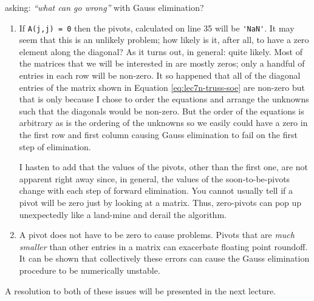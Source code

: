 \vspace{2.0cm}

 asking: \emph{``what can go wrong''} with Gauss elimination?  
\begin{enumerate}
\item If \lstinline[style=myMatlab]{A(j,j) = 0} then the pivots, calculated on line 35 will be \lstinline[style=myMatlab]{'NaN'}.  It may seem that this is an unlikely problem; how likely is it, after all, to have a zero element along the diagonal?  As it turns out, in general: quite likely.  Most of the matrices that we will be interested in are mostly zeros; only a handful of entries in each row will be non-zero.  It so happened that all of the diagonal entries of the matrix shown in Equation \ref{eq:lec7n-truss-soe} are non-zero but that is only because I chose to order the equations and arrange the unknowns such that the diagonals would be non-zero.  But the order of the equations is arbitrary as is the ordering of the unknowns so we easily could have a zero in the first row and first column causing Gauss elimination to fail on the first step of elimination.  

I hasten to add that the values of the pivots, other than the first one, are not apparent right away since, in general, the values of the soon-to-be-pivots change with each step of forward elimination.  You cannot usually tell if a pivot will be zero just by looking at a matrix.  Thus, zero-pivots can pop up unexpectedly like a land-mine and derail the algorithm.

\item A pivot does not have to be zero to cause problems.  Pivots that are \emph{much smaller} than other entries in a matrix can exacerbate floating point roundoff.  It can be shown that collectively these errors can cause the Gauss elimination procedure to be numerically unstable.\cite{trefethen2022numerical}
\end{enumerate}  

A resolution to both of these issues will be presented in the next lecture.
